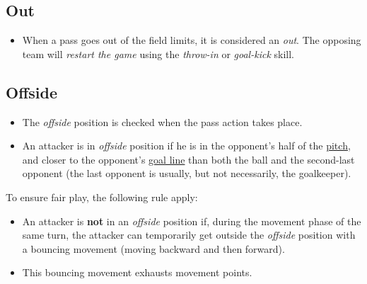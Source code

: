\documentclass[12pt]{article}
\begin{document}
\subsection{\textbf{Out}}

\begin{rulebox}
\begin{itemize}
\item When a pass goes out of the field limits, it is considered an \emph{out}. The opposing team will \emph{restart the game} using the \emph{throw-in} or \emph{goal-kick} skill.
\end{itemize}
\end{rulebox}

\subsection{Offside}



\begin{rulebox}
\begin{itemize}
\item The \emph{offside} position is checked when the pass action takes place.
\item An attacker is in \emph{offside} position if he is in the opponent's half of the \href{https://www.google.com/url?q=https://en.wikipedia.org/wiki/Association_football_pitch&sa=D&source=editors&ust=1763256892483155&usg=AOvVaw2dh-kL2MMAWFVvTZIcFHaD}{pitch}, and closer to the opponent's \href{https://www.google.com/url?q=https://en.wikipedia.org/wiki/Goal_line_(association_football)&sa=D&source=editors&ust=1763256892483356&usg=AOvVaw2Lw5qNRjCxbeQqIvhePOi4}{goal line} than both the ball and the second-last opponent (the last opponent is usually, but not necessarily, the goalkeeper).
\end{itemize}
\end{rulebox}

To ensure fair play, the following rule apply:

\begin{specialcase}
\begin{itemize}
\item An attacker is \textbf{not} in an \emph{offside} position if, during the movement phase of the same turn, the attacker can temporarily get outside the \emph{offside} position with a bouncing movement (moving backward and then forward). 
\item This bouncing movement exhausts movement points.
\end{itemize}
\end{specialcase}
\end{document}
